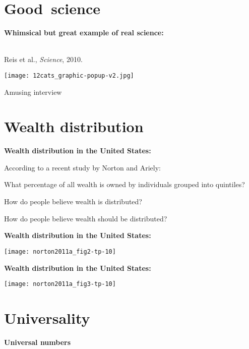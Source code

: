 \section{Good\ science}

  \textbf{Whimsical but great example of real science:}

  \\
  Reis et al., \textit{Science}, 2010.

  \medskip

  \texttt{[image: 12cats\_graphic-popup-v2.jpg]}

  Amusing interview 



\section{Wealth distribution}

  \textbf{Wealth distribution in the United States:}

  According to a recent study by Norton and Ariely:\cite{norton2011a}
  
  
    What percentage of all wealth is owned by 
    individuals grouped into quintiles?
  
    How do people believe wealth is distributed?
  
    How do people believe wealth should be distributed?
  
  


  \textbf{Wealth distribution in the United States:}

  \texttt{[image: norton2011a\_fig2-tp-10]}
  


  \textbf{Wealth distribution in the United States:}

  \texttt{[image: norton2011a\_fig3-tp-10]}
  

\section{Universality}

  \textbf{Universal numbers}

      
    
